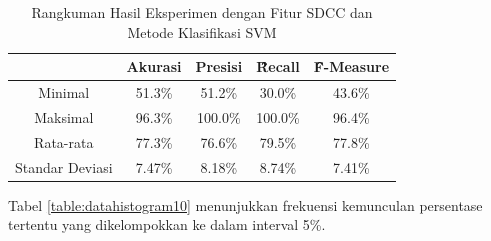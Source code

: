   \begin{table}
    \centering
    \caption{Rangkuman Hasil Eksperimen dengan Fitur SDCC dan Metode Klasifikasi SVM}
    \begin{tabular}{|c|c|c|c|c|}
      \hline
       & Akurasi & Presisi & \f{\f{Recall}} & \f{\f{F-Measure}} \\ \hline
      Minimal         & 51.3\% & 51.2\%  & 30.0\%  & 43.6\% \\ \hline
      Maksimal        & 96.3\% & 100.0\% & 100.0\% & 96.4\% \\ \hline
      Rata-rata       & 77.3\% & 76.6\%  & 79.5\%  & 77.8\% \\ \hline
      Standar Deviasi & 7.47\% & 8.18\% & 8.74\% & 7.41\%  \\ \hline
    \end{tabular}
    \label{table:sdccsvm}
  \end{table}

  Tabel \ref{table:datahistogram10} menunjukkan frekuensi kemunculan persentase tertentu yang dikelompokkan ke dalam interval 5\%.

